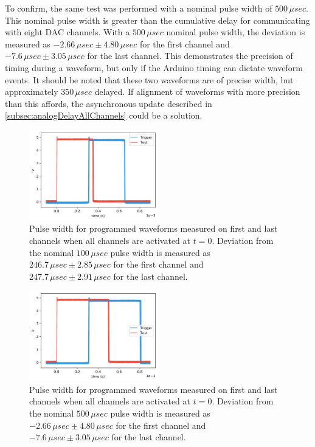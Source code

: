 \documentclass[10pt,a4paper]{article}
\begin{document}
To confirm, the same test was performed with a nominal pulse width of $500 \, \mu sec$.  This nominal pulse width is greater than the cumulative delay for communicating with eight DAC channels.  With a $500 \, \mu sec$ nominal pulse width, the deviation is measured as $-2.66\,\mu sec \pm 4.80\, \mu sec$ for the first channel and $-7.6 \, \mu sec \pm 3.05 \, \mu sec$ for the last channel.  This demonstrates the precision of timing during a waveform, but only if the Arduino timing can dictate waveform events.  It should be noted that these two waveforms are of precise width, but approximately $350 \, \mu sec$ delayed.  If alignment of waveforms with more precision than this affords, the asynchronous update described in \ref{subsec:analogDelayAllChannels} could be a solution.

\begin{figure}
	\centering
	\includegraphics[width=0.5\textwidth]{../output/topHatJitterAllChannels.png}
	\caption[topHatJitterAllChannels]{Pulse width for programmed waveforms measured on first and last channels when all channels are activated at $t = 0$.  Deviation from the nominal $100 \, \mu sec$ pulse width is measured as $246.7\,\mu sec \pm 2.85\,\mu sec$ for the first channel and $247.7\,\mu sec \pm 2.91\,\mu sec$ for the last channel.\newline}
	\label{fig:topHatJitterAllChannels}
\end{figure}

\begin{figure}
	\centering
	\includegraphics[width=0.5\textwidth]{../output/topHatJitterAllChansLonger.png}
	\caption[topHatJitterAllChannelsLonger]{Pulse width for programmed waveforms measured on first and last channels when all channels are activated at $t = 0$.  Deviation from the nominal $500 \, \mu sec$ pulse width is measured as $-2.66\,\mu sec \pm 4.80\, \mu sec$ for the first channel and $-7.6 \, \mu sec \pm 3.05 \, \mu sec$ for the last channel.\newline}
	\label{fig:topHatJitterAllChannelsLonger}
\end{figure} 
\end{document}
